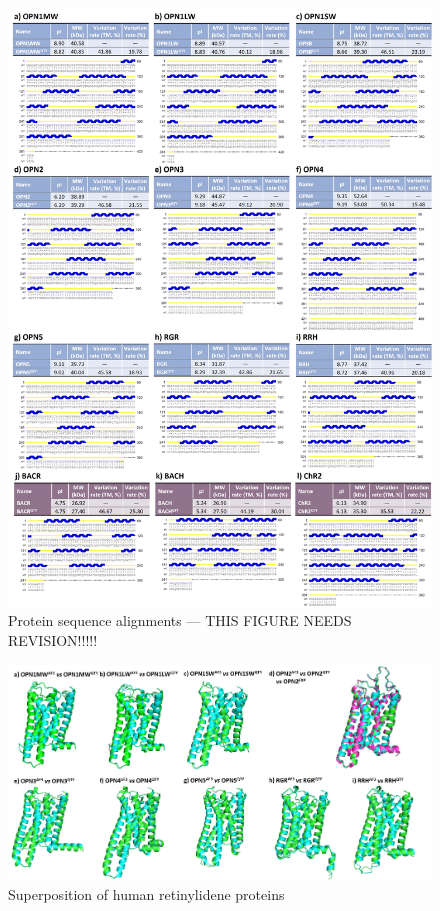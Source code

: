 \documentclass[fleqn,10pt]{manuscript}
\begin{document}
\begin{figure}[htbp]
	\centering
	\includegraphics[width=\linewidth]{Figures/sequences.jpg}
	\caption{Protein sequence alignments --- THIS FIGURE NEEDS REVISION!!!!!}
	\label{fig:sequences}
\end{figure}

\begin{figure}[htbp]
	\centering
	\includegraphics[width=\linewidth]{Figures/superposition-human.jpg}
	\caption{Superposition of human retinylidene proteins}
	\label{fig:humansup}
\end{figure}
\end{document}
